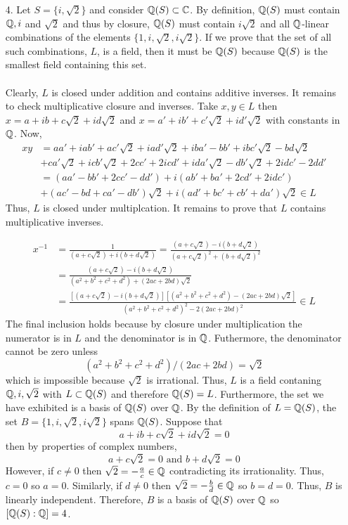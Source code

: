 \documentclass[12pt]{extarticle}
\begin{document}
\begin{enumerate}
\item[4. ] Let $S = \{i, \sqrt{2}\}$ and consider $\mathbb{Q}(S) \subset \mathbb{C}$. By definition, $\mathbb{Q}(S)$ must contain $\mathbb{Q}, i$ and $\sqrt{2}$ and thus by closure, $\mathbb{Q}(S)$ must contain $i \sqrt{2}$ and all $\mathbb{Q}$-linear combinations of the elements $\{1, i, \sqrt{2}, i \sqrt{2}\}$. If we prove that the set of all such combinations, $L$, is a field, then it must be $\mathbb{Q}(S)$ because $\mathbb{Q}(S)$ is the smallest field containing this set. \\ \\
Clearly, $L$ is closed under addition and contains additive inverses. It remains to check multiplicative closure and inverses. Take $x, y \in L$ then $x = a + ib + c \sqrt{2} + i d  \sqrt{2}$ and $x = a' + i b' + c' \sqrt{2} + i d' \sqrt{2}$ with constants in $\mathbb{Q}$. Now, 
\begin{align*}
xy & = aa' + i ab' + a c' \sqrt{2} + i a d' \sqrt{2} + i b a' - b b' + i b c' \sqrt{2} - b d \sqrt{2} \\  & + ca' \sqrt{2} + i cb' \sqrt{2} + 2 c c' + 2 i c d' + i d a' \sqrt{2} - d b' \sqrt{2} + 2i d c' - 2 dd' \\
 & = (aa' - bb'+ 2cc' - dd') + i(ab' + ba' + 2 cd' + 2idc') \\ & + (ac' - bd + ca'- db') \sqrt{2} + i (ad' + bc' + cb' + da') \sqrt{2} \in L 
\end{align*}
Thus, $L$ is closed under multiplcation. It remains to prove that $L$ contains multiplicative inverses.  

\begin{align*}
x^{-1} & = \frac{1}{(a + c \sqrt{2}) + i (b +  d \sqrt{2})} = \frac{(a + c \sqrt{2}) - i (b +  d \sqrt{2})}{(a + c \sqrt{2})^2 + (b +  d \sqrt{2})^2} \\ 
& = \frac{(a + c \sqrt{2}) - i (b +  d \sqrt{2})}{(a^2 + b^2 + c^2 + d^2) + (2ac + 2bd)\sqrt{2}} \\ 
& = \frac{\left[(a + c \sqrt{2}) - i (b +  d \sqrt{2})\right] \left[ (a^2 + b^2 + c^2 + d^2) - (2ac + 2bd)\sqrt{2} \right] }{(a^2 + b^2 + c^2 + d^2)^2 - 2 (2ac + 2bd)^2} \in L
\end{align*}
The final inclusion holds because by closure under multiplication the numerator is in $L$ and the denominator is in $\mathbb{Q}$. Futhermore, the denominator cannot be zero unless \[(a^2 + b^2 + c^2 + d^2)/(2ac + 2bd) = \sqrt{2}\] which is impossible because $\sqrt{2}$ is irrational. Thus, $L$ is a field contaning $\mathbb{Q}, i, \sqrt{2}$ with $L \subset \mathbb{Q}(S)$ and therefore $\mathbb{Q}(S) = L$. Furthermore, the set we have exhibited is a basis of $\mathbb{Q}(S)$ over $\mathbb{Q}$. By the definition of $L = \mathbb{Q}(S)$, the set $B = \{1, i, \sqrt{2}, i \sqrt{2}\}$ spans $\mathbb{Q}(S)$. Suppose that \[a + ib + c \sqrt{2} + i d \sqrt{2} = 0\] then by properties of complex numbers, \[a + c \sqrt{2} = 0 \text{ and } b + d \sqrt{2} = 0\] However, if $c \neq 0$ then $\sqrt{2} = - \frac{a}{c} \in \mathbb{Q}$ contradicting its irrationality. Thus, $c = 0$ so $a  = 0$. Similarly, if $d \neq 0$ then $\sqrt{2} = - \frac{b}{d} \in \mathbb{Q}$ so $b = d = 0$. Thus, $B$ is linearly independent. Therefore, $B$ is a basis of $\mathbb{Q}(S)$ over $\mathbb{Q}$ so $[\mathbb{Q}(S) : \mathbb{Q}] = 4$.    
\end{enumerate}
\end{document}

